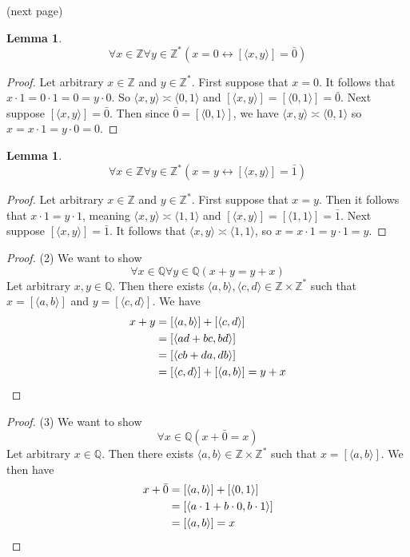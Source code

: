 \documentclass{report}
\newtheorem{lemma}[theo]{Lemma}
\begin{document}
\noindent(next page)\newpage
\begin{lemma}\label{Q_0_lemma}
\begin{equation*}
\forall x\in\mathbb Z\forall y\in\mathbb Z^*(x=0\leftrightarrow[\langle x,y\rangle]=\bar0)
\end{equation*}
\end{lemma}
\begin{proof}
Let arbitrary $x\in\mathbb Z$ and $y\in\mathbb Z^*$. First suppose that $x=0$. It follows that
$x\cdot1=0\cdot1=0=y\cdot0$. So $\langle x,y\rangle\asymp\langle 0,1\rangle$ and $[\langle x,y\rangle]=[\langle 0,1\rangle]=\bar0$. Next suppose
$[\langle x,y\rangle]=\bar0$. Then since $\bar0=[\langle0,1\rangle]$, we have $\langle x,y\rangle\asymp\langle 0,1\rangle$ so
$x=x\cdot1=y\cdot0=0$.
\end{proof}
\begin{lemma}\label{Q_1_lemma}
\begin{equation*}
\forall x\in\mathbb Z\forall y\in\mathbb Z^*(x=y\leftrightarrow[\langle x,y\rangle]=\bar1)
\end{equation*}
\end{lemma}
\begin{proof}
Let arbitrary $x\in\mathbb Z$ and $y\in\mathbb Z^*$. First suppose that $x=y$. Then it follows that
$x\cdot1=y\cdot1$, meaning $\langle x,y\rangle\asymp\langle 1,1\rangle$ and 
$[\langle x,y\rangle]=[\langle 1,1\rangle]=\bar1$. Next suppose $[\langle x,y\rangle]=\bar1$. It follows that $\langle x,y\rangle\asymp\langle1,1\rangle$, so $x=x\cdot1=y\cdot1=y$.
\end{proof}
\begin{proof}(2)
We want to show
\begin{equation*}
\forall x\in\mathbb Q\forall y\in\mathbb Q(x+y=y+x)
\end{equation*}
Let arbitrary $x,y\in\mathbb Q$. Then there exists $\langle a,b\rangle,\langle c,d\rangle\in\mathbb Z\times\mathbb Z^*$ such that 
$x=[\langle a,b\rangle]$ and $y=[\langle c,d\rangle]$.
We have
\begin{align*}
x+y&=[\langle a,b\rangle]+[\langle c,d\rangle]\\
&=[\langle ad+bc,bd\rangle]\\
&=[\langle cb+da,db\rangle]\\
&=[\langle c,d\rangle]+[\langle a,b\rangle]=y+x\qedhere
\end{align*}
\end{proof}
\begin{proof}(3)
We want to show
\begin{equation*}
\forall x\in\mathbb Q(x+\bar0=x)
\end{equation*}
Let arbitrary $x\in\mathbb Q$. Then there exists $\langle a,b\rangle\in\mathbb Z\times\mathbb Z^*$ such that 
$x=[\langle a,b\rangle]$.
We then have
\begin{align*}
x+\bar0&=[\langle a,b\rangle]+[\langle 0,1\rangle]\\
&=[\langle a\cdot1+b\cdot0,b\cdot1\rangle]\\
&=[\langle a,b\rangle]=x\qedhere
\end{align*}
\end{proof}
\end{document}
